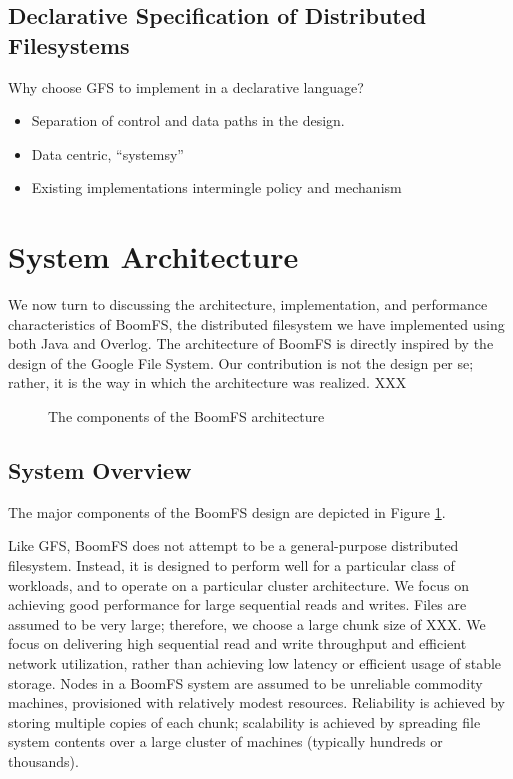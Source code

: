 \documentclass{article}
\begin{document}
\subsection{Declarative Specification of Distributed Filesystems}
Why choose GFS to implement in a declarative language?
\begin{itemize}
\item
  Separation of control and data paths in the design.

\item
  Data centric, ``systemsy''

\item
  Existing implementations intermingle policy and mechanism
\end{itemize}

\section{System Architecture}
\label{system-arch}
We now turn to discussing the architecture, implementation, and
performance characteristics of BoomFS, the distributed filesystem we
have implemented using both Java and Overlog. The architecture of
BoomFS is directly inspired by the design of the Google File
System\cite{gfs}. Our contribution is not the design per se; rather,
it is the way in which the architecture was realized. XXX

\begin{figure}
\centering
{}
\caption{The components of the BoomFS architecture}
\label{fig:system-arch}
\end{figure}

\subsection{System Overview}
The major components of the BoomFS design are depicted in Figure
\ref{fig:system-arch}. %

Like GFS, BoomFS does not attempt to be a general-purpose distributed
filesystem. Instead, it is designed to perform well for a particular
class of workloads, and to operate on a particular cluster
architecture. We focus on achieving good performance for large
sequential reads and writes. Files are assumed to be very large;
therefore, we choose a large chunk size of XXX. We focus on delivering
high sequential read and write throughput and efficient network
utilization, rather than achieving low latency or efficient usage of
stable storage. Nodes in a BoomFS system are assumed to be unreliable
commodity machines, provisioned with relatively modest resources.
Reliability is achieved by storing multiple copies of each chunk;
scalability is achieved by spreading file system contents over a large
cluster of machines (typically hundreds or thousands).
\end{document}

